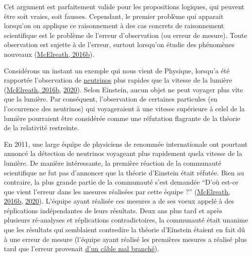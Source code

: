 \documentclass[
  a4paper,11pt,twoside,onecolumn,openright,final,oldfontcommands]{memoir}
\theoremstyle{definition}
\theoremstyle{definition}
\theoremstyle{definition}
\theoremstyle{definition}
\theoremstyle{remark}
\begin{document}
Cet argument est parfaitement valide pour les propositions logiques, qui peuvent être soit vraies, soit fausses. Cependant, le premier problème qui apparait lorsqu'on on applique ce raisonnement à des cas concrets de raisonnement scientifique est le problème de l'erreur d'observation (ou erreur de mesure). Toute observation est sujette à de l'erreur, surtout lorsqu'on étudie des phénomènes nouveaux (\protect\hyperlink{ref-mcelreath_statistical_2016}{McElreath, 2016b}).

Considérons un instant un exemple qui nous vient de Physique, lorsqu'a été rapportée l'observation de \href{https://en.wikipedia.org/wiki/Neutrino}{neutrinos} plus rapides que la vitesse de la lumière (\protect\hyperlink{ref-mcelreath_statistical_2016}{McElreath, 2016b}, \protect\hyperlink{ref-mcelreath_statistical_2020}{2020}). Selon Einstein, aucun objet ne peut voyager plus vite que la lumière. Par conséquent, l'observation de certaines particules (en l'occurrence des neutrinos) qui voyageraient à une vitesse supérieure à celel de la lumière pourraient être considérée comme une réfutation flagrante de la théorie de la relativité restreinte.

En 2011, une large équipe de physiciens de renommée internationale ont pourtant annoncé la détection de neutrinos voyageant plus rapidement quela vitesse de la lumière. De manière intéressante, la première réaction de la communauté scientifique ne fut pas d'annoncer que la théorie d'Einstein était réfutée. Bien au contraire, la plus grande partie de la communauté s'est demandée ``D'où est-ce que vient l'erreur dans les mesures réalisées par cette équipe ?'' (\protect\hyperlink{ref-mcelreath_statistical_2016}{McElreath, 2016b}, \protect\hyperlink{ref-mcelreath_statistical_2020}{2020}). L'équipe ayant réalisée ces mesures a de ses voeux appelé à des réplications indépendantes de leurs résultats. Deux ans plus tard et après plusieurs ré-analyses et réplications contradictoires, la communauté était unanime que les résultats qui semblaient contredire la théorie d'Einstein étaient en fait dû à une erreur de mesure (l'équipe ayant réalisé les premières mesures a réalisé plus tard que l'erreur provenait \href{https://profmattstrassler.com/articles-and-posts/particle-physics-basics/neutrinos/neutrinos-faster-than-light/opera-what-went-wrong/}{d'un câble mal branché}).
\end{document}
